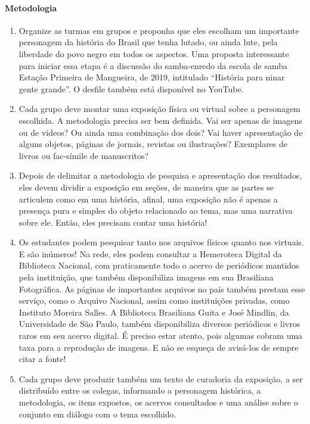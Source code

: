 \documentclass[12pt]{extarticle}
\begin{document}
\paragraph{Metodologia}
\begin{enumerate}
\item
Organize as turmas em grupos e proponha que
eles escolham um importante personagem da história do Brasil que tenha
lutado, ou ainda lute, pela liberdade do povo negro em todos os
aspectos. Uma proposta interessante para iniciar essa etapa é a
discussão do samba-enredo da escola de samba Estação Primeira de
Mangueira, de 2019, intitulado ``História para ninar gente grande''. O
desfile também está disponível no YouTube.


\item
Cada grupo deve montar uma exposição física ou virtual sobre a
personagem escolhida. A metodologia precisa ser bem definida. Vai ser
apenas de imagens ou de vídeos? Ou ainda uma combinação dos dois? Vai
haver apresentação de alguns objetos, páginas de jornais, revistas ou
ilustrações? Exemplares de livros ou fac-símile de manuscritos?

\item
Depois de delimitar a metodologia de pesquisa e apresentação dos
resultados, eles devem dividir a exposição em seções, de maneira que as
partes se articulem como em uma história, afinal, uma exposição não é
apenas a presença pura e simples do objeto relacionado ao tema, mas uma
narrativa sobre ele. Então, eles precisam contar uma história!

\item
Os estudantes podem pesquisar tanto nos arquivos físicos quanto nos
virtuais. E são inúmeros! Na rede, eles podem consultar a Hemeroteca
Digital da Biblioteca Nacional, com praticamente todo o acervo de
periódicos mantidos pela instituição, que também disponibiliza imagens
em sua Brasiliana Fotográfica. As páginas de importantes arquivos no
país também prestam esse serviço, como o Arquivo Nacional, assim como
instituições privadas, como Instituto Moreira Salles. A Biblioteca
Brasiliana Guita e José Mindlin, da Universidade de São Paulo, também
disponibiliza diversos periódicos e livros raros em seu acervo digital.
É preciso estar atento, pois algumas cobram uma taxa para a reprodução
de imagens. E não se esqueça de avisá-los de sempre citar a fonte!

\item
Cada grupo deve produzir também um texto de curadoria da exposição, a
ser distribuído entre os colegas, informando a personagem histórica, a
metodologia, os itens expostos, os acervos consultados e uma análise
sobre o conjunto em diálogo com o tema escolhido.
\end{enumerate}
\end{document}
